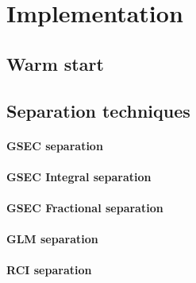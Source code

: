 \chapter{Implementation}

\section{Warm start}

\section{Separation techniques}

\subsubsection{GSEC separation}

\subsubsection{GSEC Integral separation}

\subsubsection{GSEC Fractional separation}

\subsubsection{GLM separation}

\subsubsection{RCI separation}
